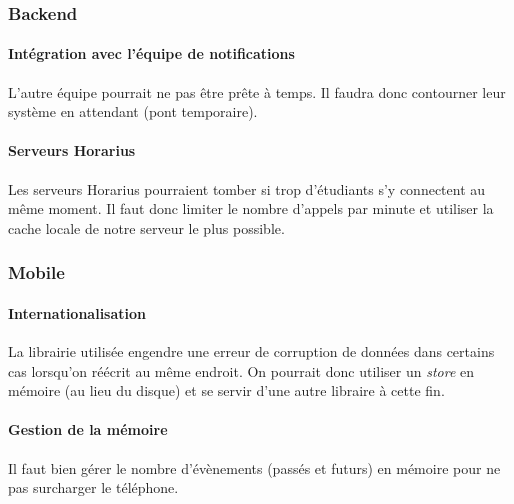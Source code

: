 \subsubsection{Backend}

	\paragraph{Intégration avec l'équipe de notifications} L'autre équipe pourrait ne pas être prête à temps. Il faudra donc contourner leur système en attendant (pont temporaire).
	
	\paragraph{Serveurs Horarius} Les serveurs Horarius pourraient tomber si trop d'étudiants s'y connectent au même moment. Il faut donc limiter le nombre d'appels par minute et utiliser la cache locale de notre serveur le plus possible.

\subsubsection{Mobile}
	\paragraph{Internationalisation} La librairie utilisée engendre une erreur de corruption de données dans certains cas lorsqu'on réécrit au même endroit. On pourrait donc utiliser un \emph{store} en mémoire (au lieu du disque) et se servir d'une autre libraire à cette fin.
	
	\paragraph{Gestion de la mémoire} Il faut bien gérer le nombre d'évènements (passés et futurs) en mémoire pour ne pas surcharger le téléphone.
